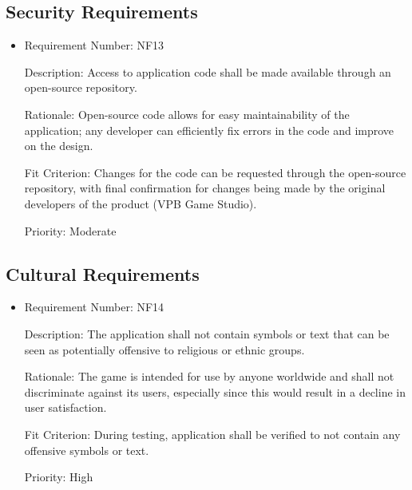 \documentclass[12pt, titlepage]{article}
\begin{document}
\subsection{Security Requirements}
\begin{itemize}
	\item
	Requirement Number: \hypertarget{nf13}{NF13}

	Description: Access to application code shall be made available through an open-source repository.

	Rationale: Open-source code allows for easy maintainability of the application; any developer can efficiently fix errors in the code and improve on the design.

	Fit Criterion: Changes for the code can be requested through the open-source repository, with final confirmation for changes being made by the original developers of the product (VPB Game Studio).

	Priority: Moderate
\end{itemize}

\subsection{Cultural Requirements}
\begin{itemize}
	\item
	Requirement Number: \hypertarget{nf14}{NF14}

	Description: The application shall not contain symbols or text that can be seen as potentially offensive to religious or ethnic groups.

	Rationale: The game is intended for use by anyone worldwide and shall not discriminate against its users, especially since this would result in a decline in user satisfaction.

	Fit Criterion: During testing, application shall be verified to not contain any offensive symbols or text.

	Priority: High
\end{itemize}
\end{document}
